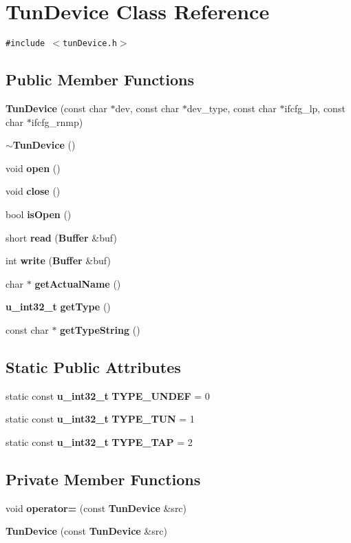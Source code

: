 \section{Tun\-Device Class Reference}
\label{classTunDevice}
{\tt \#include $<$tun\-Device.h$>$}

\subsection*{Public Member Functions}
\begin{CompactItemize}
\item 
{\bf Tun\-Device} (const char $\ast$dev, const char $\ast$dev\_\-type, const char $\ast$ifcfg\_\-lp, const char $\ast$ifcfg\_\-rnmp)
\item 
{\bf $\sim$Tun\-Device} ()
\item 
void {\bf open} ()
\item 
void {\bf close} ()
\item 
bool {\bf is\-Open} ()
\item 
short {\bf read} ({\bf Buffer} \&buf)
\item 
int {\bf write} ({\bf Buffer} \&buf)
\item 
char $\ast$ {\bf get\-Actual\-Name} ()
\item 
{\bf u\_\-int32\_\-t} {\bf get\-Type} ()
\item 
const char $\ast$ {\bf get\-Type\-String} ()
\end{CompactItemize}
\subsection*{Static Public Attributes}
\begin{CompactItemize}
\item 
static const {\bf u\_\-int32\_\-t} {\bf TYPE\_\-UNDEF} = 0
\item 
static const {\bf u\_\-int32\_\-t} {\bf TYPE\_\-TUN} = 1
\item 
static const {\bf u\_\-int32\_\-t} {\bf TYPE\_\-TAP} = 2
\end{CompactItemize}
\subsection*{Private Member Functions}
\begin{CompactItemize}
\item 
void {\bf operator=} (const {\bf Tun\-Device} \&src)
\item 
{\bf Tun\-Device} (const {\bf Tun\-Device} \&src)
\end{CompactItemize}
